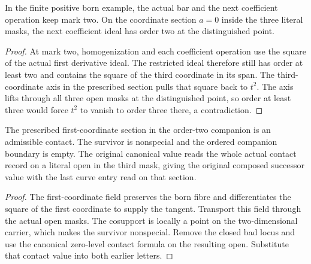 \begin{theorem}
\label{hir:g1-recursive-born-order-two-coefficient}
\leanok
In the finite positive born example, the actual bar and the next
coefficient operation keep mark two. On the coordinate section
$a=0$ inside the three literal masks, the next coefficient ideal
has order two at the distinguished point.
\end{theorem}
\begin{proof}
At mark two, homogenization and each coefficient operation use
the square of the actual first derivative ideal. The restricted
ideal therefore still has order at least two and contains the
square of the third coordinate in its span. The third-coordinate
axis in the prescribed section pulls that square back to $t^2$.
The axis lifts through all three open masks at the distinguished
point, so order at least three would force $t^2$ to vanish to
order three there, a contradiction.
\end{proof}

\begin{theorem}
\label{hir:g1-recursive-born-order-two-canonical-tangent}
\leanok
The prescribed first-coordinate section in the order-two
companion is an admissible contact. The survivor is nonspecial
and the ordered companion boundary is empty. The original
canonical value reads the whole actual contact record on a
literal open in the third mask, giving the original composed
successor value with the last curve entry read on that section.
\end{theorem}
\begin{proof}
The first-coordinate field preserves the born fibre and
differentiates the square of the first coordinate to supply the
tangent. Transport this field through the actual open masks.
The cosupport is locally a point on the two-dimensional carrier,
which makes the survivor nonspecial. Remove the closed bad locus
and use the canonical zero-level contact formula on the resulting
open. Substitute that contact value into both earlier letters.
\end{proof}

